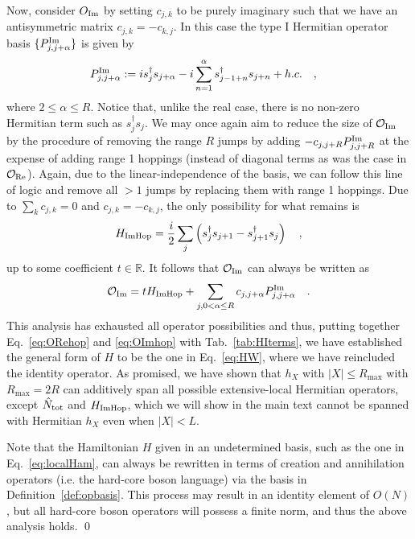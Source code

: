 \documentclass[prx,letterpaper,aps,superscriptaddress,floatfix,twocolumn,nofootinbib]{revtex4-2}
\theoremstyle{definition}
\begin{document}
    Now, consider $O_{\rm Im}$ by setting $c_{j,k}$ to be purely imaginary such that we have an antisymmetric matrix $c_{j,k}=-c_{k,j}$. In this case the type I Hermitian operator basis $\{P_{j,j+\alpha}^{\rm Im}\}$ is given by
    \begin{align}
        P_{j,j+\alpha}^{\rm Im}&:= i s_j^\dag s_{j+\alpha}-i\sum_{n=1}^{\alpha}s_{j-1+n}^\dag s_{j+n}+h.c.\quad,
        \label{eq:PIm}
    \end{align}
    where $2\leq\alpha\leq R$.
    Notice that, unlike the real case, there is no non-zero Hermitian term such as $s_j^\dag s_j$.
    We may once again aim to reduce the size of $\mathcal{O}_{\rm Im}$ by the procedure of removing the range $R$ jumps by adding $-c_{j,j+R}P_{j,j+R}^{\rm Im}$ at the expense of adding range 1 hoppings (instead of diagonal terms as was the case in $\mathcal{O}_{\rm Re}$).
    Again, due to the linear-independence of the basis, we can follow this line of logic and remove all $>1$ jumps by replacing them with range 1 hoppings.
    Due to $\sum_k c_{j,k}=0$ and $c_{j,k}=-c_{k,j}$, the only possibility for what remains is
    \begin{align}
        H_{\rm ImHop}= \frac{i}{2}\sum_j \left(s_j^\dag s_{j+1}-s_{j+1}^\dag s_j\right)\quad,
    \end{align}
    up to some coefficient $t\in\mathbb{R}$.
    It follows that $\mathcal{O}_{\rm Im}$ can always be written as
    \begin{align}
        \mathcal{O}_{\rm Im}=t H_{\rm ImHop}+\sum_{\substack{j,0<\alpha\leq R}} c_{j,j+\alpha}P_{j,j+\alpha}^{\rm Im}\quad.
        \label{eq:OImhop}
    \end{align}
    This analysis has exhausted all operator possibilities and thus, putting together Eq.~\eqref{eq:ORehop} and \eqref{eq:OImhop} with Tab.~\ref{tab:HIterms}, we have established the general form of $H$ to be the one in Eq.~\eqref{eq:HW}, where we have reincluded the identity operator. As promised, we have shown that $h_X$ with $|X|\leq R_{\text{max}}$ with $R_{\text{max}}=2R$ can additively span all possible extensive-local Hermitian operators, except $\hat{N}_{\rm tot}$ and $H_{\rm ImHop}$, which we will show in the main text cannot be spanned with Hermitian $h_X$ even when $|X|<L$.

    Note that the Hamiltonian $H$ given in an undetermined basis, such as the one in Eq.~\eqref{eq:localHam}, can always be rewritten in terms of creation and annihilation operators (i.e. the hard-core boson language) via the basis in Definition~\ref{def:opbasis}.
    This process may result in an identity element of $O(N)$, but all hard-core boson operators will possess a finite norm, and thus the above analysis holds. \qed
\end{document}
